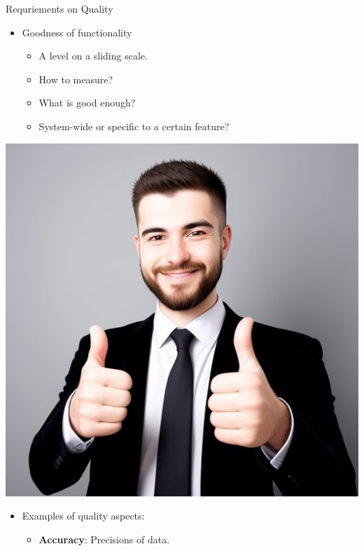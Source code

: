 \documentclass{simpleslides}
\begin{document}
\begin{frame}[fragile]{Requriements on Quality}
\begin{minipage}[t]{0.8\textwidth}
\vspace{0pt}
\begin{itemize}
\item Goodness of functionality 
\begin{itemize}
  \item A level on a sliding scale.
  \item How to measure?
  \item What is good enough?
  \item System-wide or specific to a certain feature?
\end{itemize}
\end{itemize}
\end{minipage}%
\begin{minipage}[t]{0.2\textwidth}
  \vspace{0pt}
  \hfill\includegraphics[width=1.0\textwidth]{img/thumbs-up}
  \end{minipage}%
\begin{itemize}
\item Examples of quality aspects:
\begin{itemize}
\item \textbf{Accuracy}: Precisions of data.

\end{itemize}
\end{itemize}
\end{frame}
\end{document}
